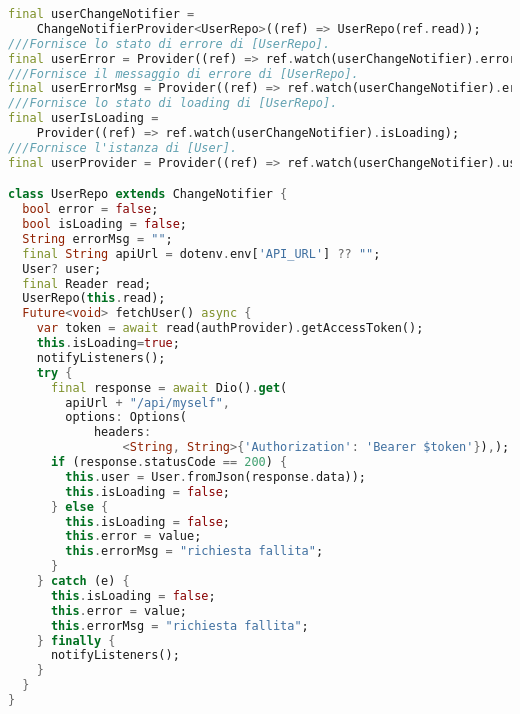 \begin{lstlisting}[language=dart, firstnumber=1,caption={User provider}]
final userChangeNotifier =
    ChangeNotifierProvider<UserRepo>((ref) => UserRepo(ref.read));
///Fornisce lo stato di errore di [UserRepo].
final userError = Provider((ref) => ref.watch(userChangeNotifier).error);
///Fornisce il messaggio di errore di [UserRepo].
final userErrorMsg = Provider((ref) => ref.watch(userChangeNotifier).errorMsg);
///Fornisce lo stato di loading di [UserRepo].
final userIsLoading =
    Provider((ref) => ref.watch(userChangeNotifier).isLoading);
///Fornisce l'istanza di [User].
final userProvider = Provider((ref) => ref.watch(userChangeNotifier).user);

class UserRepo extends ChangeNotifier {
  bool error = false;
  bool isLoading = false;
  String errorMsg = "";
  final String apiUrl = dotenv.env['API_URL'] ?? "";
  User? user;
  final Reader read;
  UserRepo(this.read);
  Future<void> fetchUser() async {
    var token = await read(authProvider).getAccessToken();
    this.isLoading=true;
	notifyListeners();
    try {
      final response = await Dio().get(
        apiUrl + "/api/myself",
        options: Options(
            headers: 
                <String, String>{'Authorization': 'Bearer $token'}),);
      if (response.statusCode == 200) {
        this.user = User.fromJson(response.data));
        this.isLoading = false;
      } else {
        this.isLoading = false;
        this.error = value;
        this.errorMsg = "richiesta fallita";
      }
    } catch (e) {
      this.isLoading = false;
	  this.error = value;
      this.errorMsg = "richiesta fallita";
    } finally {
	  notifyListeners();
    }
  }
}
\end{lstlisting}
